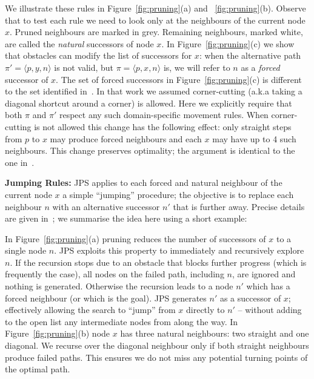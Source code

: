 We illustrate these rules in Figure~\ref{fig:pruning}(a) and ~\ref{fig:pruning}(b).
Observe that to test each rule we need to look only at
the neighbours of the current node $x$. 
Pruned neighbours are marked in grey. Remaining neighbours, marked
white, are called the \emph{natural} successors of node $x$.  
In Figure~\ref{fig:pruning}(c) we show
that obstacles can modify the list of successors for $x$:
when the alternative path $\pi' = \langle p, y, n \rangle$ is
not valid, but $\pi = \langle p, x, n \rangle$ is, we will refer to $n$ as
a \emph{forced} successor of $x$.
The set of forced successors in Figure~\ref{fig:pruning}(c) is different
to the set identified in~\cite{harabor11b}. 
In that work we assumed corner-cutting (a.k.a taking a diagonal shortcut around a corner) is allowed.
Here we explicitly require that both $\pi$ and $\pi'$ respect 
any such domain-specific movement rules.
When corner-cutting is not allowed this change has the following effect:
only straight steps from $p$ to $x$ may produce forced neighbours and each $x$ may have 
up to 4 such neighbours.
This change preserves optimality; the argument is identical to 
the one in~\cite{harabor11b}.

\textbf{Jumping Rules:}
JPS applies to each forced and natural neighbour of the current node $x$ a simple
``jumping'' procedure; the objective is to replace each neighbour $n$ with an 
alternative successor $n'$ that is further away. Precise details are given
in~\cite{harabor11b}; we summarise the idea here using a short example:

\begin{example}
In Figure~\ref{fig:pruning}(a) pruning reduces the number
of successors of $x$ to a single node $n$.
JPS exploits this property to immediately and recursively
explore $n$.
If the recursion stops due to an obstacle that blocks further progress
(which is frequently the case), all nodes on the failed path, including $n$, are ignored
and nothing is generated.
Otherwise the recursion leads to a node $n'$ which has a forced
neighbour (or which is the goal). JPS generates $n'$ as a successor of $x$; 
effectively allowing the search to ``jump'' from $x$ directly to $n'$ -- without adding
to the open list any intermediate nodes from along the way.
In Figure~\ref{fig:pruning}(b) node $x$ has three natural neighbours: two straight and one diagonal.
We recurse over the diagonal neighbour only if both straight neighbours produce
failed paths. This ensures we do not miss any potential turning points of the optimal path.
\end{example}

